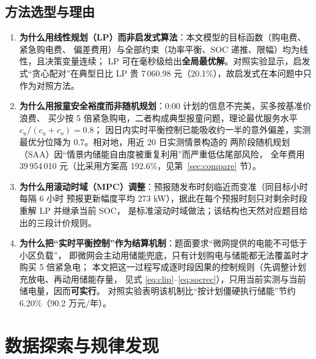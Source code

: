 \documentclass[12pt,a4paper,fontset=fandol]{ctexart}
\begin{document}
\subsection{方法选型与理由}

\begin{enumerate}[label=(\arabic*), leftmargin=2.2em, itemsep=2pt]
\item \textbf{为什么用线性规划（LP\nobreak）而非启发式算法}\nobreak：本文模型的目标函数（购电费\nobreak、紧急购电费\nobreak、
偏差费用\nobreak）与全部约束（功率平衡\nobreak、SOC 递推\nobreak、限幅\nobreak）均为线性\nobreak，且决策变量连续\nobreak；
LP 可在毫秒级给出\textbf{全局最优解}\nobreak。对照实验显示\nobreak，启发式“贪心配对\nobreak”在典型日比 LP 贵
7\,060.98 元（20.1\%\nobreak）\nobreak，故启发式在本问题中只作为对照方法\nobreak。
\item \textbf{为什么用报童安全裕度而非随机规划}\nobreak：0:00 计划的信息不完美\nobreak，买多按基准价浪费\nobreak、
买少按 5 倍紧急购电\nobreak，二者构成典型报童问题\nobreak，理论最优服务水平 $c_u/(c_u+c_o)=0.8$\nobreak；
因日内实时平衡控制已能吸收约一半的意外偏差\nobreak，实测最优分位降为 0.7\nobreak。相对地\nobreak，用近 20 日实测情景构造的
两阶段随机规划（SAA\nobreak）因“情景内储能自由度被重复利用\nobreak”而严重低估尾部风险\nobreak，
全年费用 39\,954\,010 元（比采用方案高 192.6\%\nobreak，见第~\ref{sec:compare} 节\nobreak）\nobreak。
\item \textbf{为什么用滚动时域（MPC\nobreak）调整}\cite{mpc,cn102184475}\nobreak：预报随发布时刻临近而变准（同目标小时每隔 6 小时
预报更新幅度平均 273 kW\nobreak）\nobreak，据此在每个预报时刻只对剩余时段重解 LP 并继承当前 SOC\nobreak，
是标准滚动时域做法\nobreak；该结构也天然对应题目给出的三段计价规则\nobreak。
\item \textbf{为什么把“实时平衡控制\nobreak”作为结算机制}\nobreak：题面要求“微网提供的电能不可低于小区负载\nobreak”\nobreak，
即微网会主动用储能兜底\nobreak，只有计划购电与储能都无法覆盖时才购买 5 倍紧急电\nobreak；
本文把这一过程写成逐时段因果的控制规则（先调整计划充放电\nobreak、再动用储能存量\nobreak，
见式 \eqref{eq:clip}--\eqref{eq:socrec}\nobreak）\nobreak，只用当前实测与当前储电量\nobreak，因而\textbf{可实行}\nobreak。
对照实验表明该机制比“按计划僵硬执行储能\nobreak”节约 6.20\%（90.2 万元/年\nobreak）\nobreak。
\end{enumerate}


\section{数据探索与规律发现}
\end{document}
